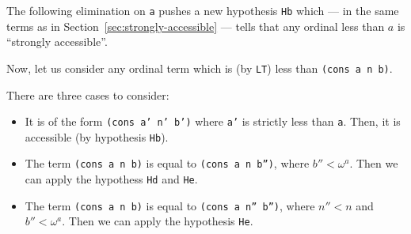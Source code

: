 The following elimination on \texttt{a} pushes a new hypothesis \texttt{Hb} which --- in the same terms as in Section~\vref{sec:strongly-accessible} --- tells that any ordinal less than $a$ is ``strongly accessible''.


Now, let us consider any ordinal term which is (by \texttt{LT}) less than \texttt{(cons a n b)}.

There are three cases to consider:
\begin{itemize}
\item It is of the form \texttt{(cons a' n' b')} where \texttt{a'} is strictly less than \texttt{a}. Then, it is accessible (by hypothesis \texttt{Hb}).

  \item The term \texttt{(cons a n b)} is equal to
    \texttt{(cons a n b'')}, where $b''<\omega^a$. Then we can apply the hypothess \texttt{Hd} and \texttt{He}.
\item
  The term \texttt{(cons a n b)} is equal to
  \texttt{(cons a n'' b'')}, where $n''<n$ and $b''<\omega^a$. Then we can apply the hypothesis \texttt{He}.
  
  
\end{itemize}